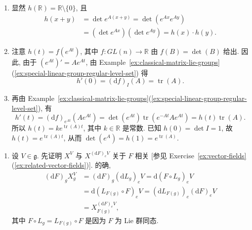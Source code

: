 \begin{description}[font=\normalfont,leftmargin=2em,labelwidth=1.5em]
\begin{enumerate}[label=(\alph*),ref=\alph*,leftmargin=*]
\item 显然 $h(\mathbb{R})=\mathbb{R}\setminus\{0\}$, 且
\begin{align*}
  h(x+y)&=\det e^{A(x+y)}=\det(e^{Ax}e^{Ay})\\
        &=(\det e^{Ax})(\det e^{Ay})=h(x)\cdot h(y).
\end{align*}
\item 注意 $h(t)=f(e^{At})$, 其中 $f:GL(n)\to\mathbb{R}$ 由 $f(B)=\det(B)$ 给出. 因此, 由于 $(e^{At})'=Ae^{At}$, 由 Example~\ref{ex:classical-matrix-lie-groups}(\ref{ex:special-linear-group-regular-level-set}) 得
\[
  h'(0)=(\mathrm{d}f)_I(A)=\operatorname{tr}(A).
\]
\item 再由 Example~\ref{ex:classical-matrix-lie-groups}(\ref{ex:special-linear-group-regular-level-set}), 有
\[
  h'(t)
  =(\mathrm{d}f)_{e^{At}}(Ae^{At})
  =\det(e^{At})\operatorname{tr}(e^{-At}Ae^{At})
  =h(t)\operatorname{tr}(A).
\]
所以 $h(t)=ke^{\operatorname{tr}(A)t}$, 其中 $k\in\mathbb{R}$ 是常数. 已知 $h(0)=\det I=1$, 故 $h(t)=e^{\operatorname{tr}(A)t}$, 从而 $\det(e^A)=h(1)=e^{\operatorname{tr}(A)}$.
\end{enumerate}

\begin{enumerate}[label=(\alph*),ref=\alph*,leftmargin=*]
\item 设 $V\in\mathfrak{g}$. 先证明 $X^V$ 与 $X^{(\mathrm{d}F)_eV}$ 关于 $F$ 相关 [参见 Exercise~\ref{ex:vector-fields}(\ref{ex:related-vector-fields})]. 的确,
\begin{align*}
  (\mathrm{d}F)_gX_g^V
  &=(\mathrm{d}F)_g(\mathrm{d}L_g)_eV=\mathrm{d}(F\circ L_g)_eV\\
  &=\mathrm{d}(L_{F(g)}\circ F)_eV=(\mathrm{d}L_{F(g)})_e(\mathrm{d}F)_eV\\
  &=X_{F(g)}^{(\mathrm{d}F)_eV},
\end{align*}
其中 $F\circ L_g=L_{F(g)}\circ F$ 是因为 $F$ 为 Lie 群同态.


\end{enumerate}
\end{description}
